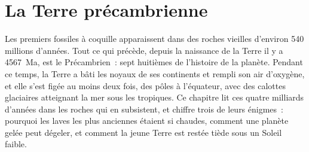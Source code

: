 \chapter{La Terre précambrienne}\label{ch:b2:precambrian-earth}

Les premiers fossiles à coquille apparaissent dans des roches vieilles d'environ 540 millions
d'années. Tout ce qui précède, depuis la naissance de la Terre il y a \qty{4567}{Ma}, est le Précambrien~: sept huitièmes
de l'histoire de la planète. Pendant ce temps, la Terre a bâti les noyaux de ses continents et rempli son air d'oxygène,
et elle s'est figée au moins deux fois, des pôles à l'équateur, avec des calottes glaciaires atteignant la mer
sous les tropiques. Ce chapitre lit ces quatre milliards d'années dans les roches qui en subsistent, et
chiffre trois de leurs énigmes~: pourquoi les laves les plus anciennes étaient si chaudes, comment une planète gelée peut
dégeler, et comment la jeune Terre est restée tiède sous un Soleil faible.

